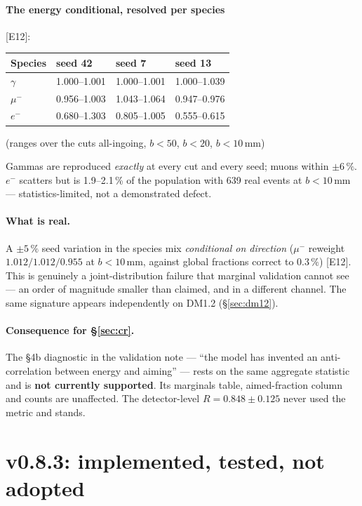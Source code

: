 \documentclass[11pt,a4paper]{article}
\newcommand{\ev}[1]{{\footnotesize\textcolor{prov}{[#1]}}}
\begin{document}
\paragraph{The energy conditional, resolved per species} \ev{E12}:

\begin{center}
\begin{tabular}{llll}
\toprule
Species & seed 42 & seed 7 & seed 13 \\
\midrule
$\gamma$   & 1.000--1.001 & 1.000--1.001 & 1.000--1.039 \\
$\mu^{-}$  & 0.956--1.003 & 1.043--1.064 & 0.947--0.976 \\
$e^{-}$    & 0.680--1.303 & 0.805--1.005 & 0.555--0.615 \\
\bottomrule
\end{tabular}
\end{center}
(ranges over the cuts all-ingoing, $b<50$, $b<20$, $b<10$\,mm)

Gammas are reproduced \emph{exactly} at every cut and every seed; muons within
$\pm6\,\%$. $e^{-}$ scatters but is 1.9--2.1\,\% of the population with 639 real
events at $b<10$\,mm --- statistics-limited, not a demonstrated defect.

\paragraph{What is real.} A $\pm5\,\%$ seed variation in the species mix
\emph{conditional on direction} ($\mu^{-}$ reweight $1.012/1.012/0.955$ at
$b<10$\,mm, against global fractions correct to $0.3\,\%$) \ev{E12}. This is
genuinely a joint-distribution failure that marginal validation cannot see ---
an order of magnitude smaller than claimed, and in a different channel. The
same signature appears independently on DM1.2 (\S\ref{sec:dm12}).

\paragraph{Consequence for \S\ref{sec:cr}.} The \S4b diagnostic in the
validation note --- ``the model has invented an anti-correlation between energy
and aiming'' --- rests on the same aggregate statistic and is \textbf{not
currently supported}. Its marginals table, aimed-fraction column and counts are
unaffected. The detector-level $R = 0.848 \pm 0.125$ never used the metric and
stands.

\section{v0.8.3: implemented, tested, not adopted}
\label{sec:v083}
\end{document}
